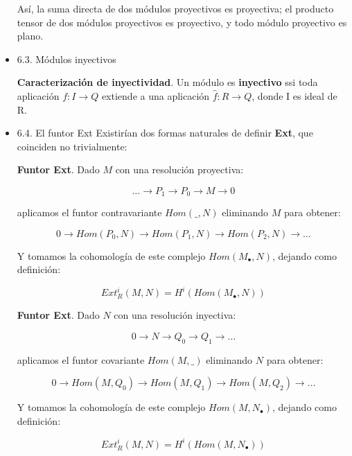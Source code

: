 \documentclass[11pt]{article}
\begin{document}
\begin{itemize}
Así, la suma directa de dos módulos proyectivos es proyectiva; el producto tensor
de dos módulos proyectivos es proyectivo, y todo módulo proyectivo es plano.

\item 6.3. Módulos inyectivos
\label{sec-4-4-4-3}
\begin{theorem}
\textbf{Caracterización de inyectividad}. Un módulo es \textbf{inyectivo} ssi toda aplicación
$f : I \longrightarrow Q$ extiende a una aplicación $\hat f : R \longrightarrow Q$, donde I es ideal de R.
\end{theorem}

\item 6.4. El funtor Ext
\label{sec-4-4-4-4}
Existirían dos formas naturales de definir \textbf{Ext}, que coinciden no trivialmente:

\begin{definition}
\textbf{Funtor Ext}. Dado $M$ con una resolución proyectiva:

\[ \dots \overset{}\longrightarrow P_1 \overset{}\longrightarrow P_0 \overset{}\longrightarrow M \overset{}\longrightarrow 0 \]

aplicamos el funtor contravariante $Hom(\_,N)$ eliminando $M$ para obtener:

\[ 0 \overset{}\longrightarrow Hom(P_0,N) \overset{}\longrightarrow Hom(P_1,N) \overset{}\longrightarrow Hom(P_2,N) \overset{}\longrightarrow \dots \]

Y tomamos la cohomología de este complejo $Hom(M_\bullet,N)$, dejando como definición:

\[Ext^i_R(M,N) = H^i(Hom(M_\bullet,N))\]
\end{definition}

\begin{definition}
\textbf{Funtor Ext}. Dado $N$ con una resolución inyectiva:

\[ 0 \overset{}\longrightarrow N \overset{}\longrightarrow Q_0 \overset{}\longrightarrow Q_1 \overset{}\longrightarrow \dots \]

aplicamos el funtor covariante $Hom(M,\_)$ eliminando $N$ para obtener:

\[ 0 \overset{}\longrightarrow 
 Hom(M,Q_0) \overset{}\longrightarrow 
 Hom(M,Q_1) \overset{}\longrightarrow 
 Hom(M,Q_2) \overset{}\longrightarrow \dots \]

Y tomamos la cohomología de este complejo $Hom(M,N_\bullet)$, dejando como definición:

\[Ext^i_R(M,N) = H^i(Hom(M,N_\bullet))\]
\end{definition}
\end{itemize}
\end{document}
